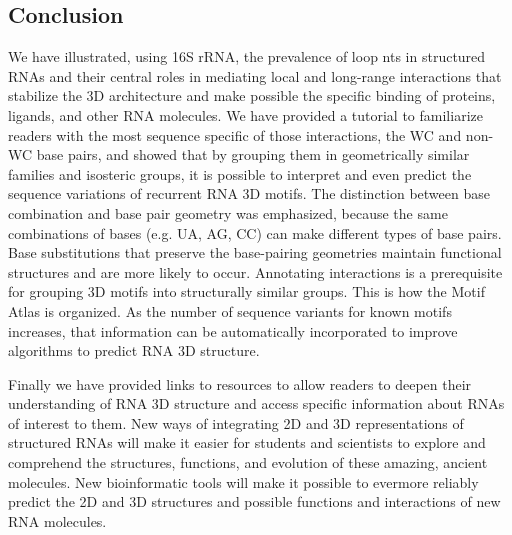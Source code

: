 \subsection{Conclusion}

We have illustrated, using 16S rRNA, the prevalence of loop nts in structured
RNAs and their central roles in mediating local and long-range interactions that
stabilize the 3D architecture and make possible the specific binding of
proteins, ligands, and other RNA molecules. We have provided a tutorial to
familiarize readers with the most sequence specific of those interactions, the
WC and non-WC base pairs, and showed that by grouping them in geometrically
similar families and isosteric groups, it is possible to interpret and even
predict the sequence variations of recurrent RNA 3D motifs. The distinction
between base combination and base pair geometry was emphasized, because the same
combinations of bases (e.g. UA, AG, CC) can make different types of base pairs.
Base substitutions that preserve the base-pairing geometries maintain functional
structures and are more likely to occur. Annotating interactions is a
prerequisite for grouping 3D motifs into structurally similar groups. This is
how the Motif Atlas is organized. As the number of sequence variants for known
motifs increases, that information can be automatically incorporated to improve
algorithms to predict RNA 3D structure. 

Finally we have provided links to resources to allow readers to deepen their
understanding of RNA 3D structure and access specific information about RNAs of
interest to them. New ways of integrating 2D and 3D representations of
structured RNAs will make it easier for students and scientists to explore and
comprehend the structures, functions, and evolution of these amazing, ancient
molecules. New bioinformatic tools will make it possible to evermore reliably
predict the 2D and 3D structures and possible functions and interactions of new
RNA molecules.
